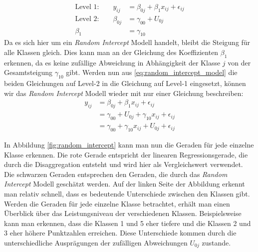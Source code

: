 \documentclass[12pt, a4paper]{article}\usepackage[]{graphicx}\usepackage[]{color}
\begin{document}
\begin{equation} \label{eq:random_intercept_model}
\begin{split}	
 \text{Level 1:}  	\qquad 	y_{ij} 		& = \beta_{0j} + \beta_{1}x_{ij} + \epsilon_{ij}\\
 \text{Level 2:} 	\qquad 	\beta_{0j} 	& = \gamma_{00} + U_{0j}\\
 							\beta_{1} 	& = \gamma_{10}
\end{split}	
\end{equation} 
Da es sich hier um ein \textit{Random Intercept} Modell handelt, bleibt die Steigung für alle Klassen gleich. Dies kann man an der Gleichung des Koeffizienten $\beta_{1}$ erkennen, da es keine zufällige Abweichung in Abhängigkeit der Klasse $j$ von der Gesamtsteigung $\gamma_{10}$ gibt. Werden nun aus \eqref{eq:random_intercept_model} die beiden Gleichungen auf Level-2 in die Gleichung auf Level-1 eingesetzt, können wir das \textit{Random Intercept} Modell wieder mit nur einer Gleichung beschreiben:
\begin{equation}
\begin{split}
y_{ij} 	& = \beta_{0j} + \beta_{1}x_{ij} + \epsilon_{ij} \\
		& = \gamma_{00} + U_{0j} + \gamma_{10}x_{ij} + \epsilon_{ij} \\
		& = \gamma_{00} + \gamma_{10}x_{ij} + U_{0j} + \epsilon_{ij}
\end{split}
\end{equation}

In Abbildung \ref{fig:random_intercept} kann man nun die Geraden für jede einzelne Klasse erkennen. Die rote Gerade entspricht der linearen Regressionsgerade, die durch die Disaggregation entsteht und wird hier als Vergleichswert verwendet. Die schwarzen Geraden entsprechen den Geraden, die durch das \textit{Random Intercept} Modell geschätzt werden. Auf der linken Seite der Abbildung erkennt man relativ schnell, dass es bedeutende Unterschiede zwischen den Klassen gibt. Werden die Geraden für jede einzelne Klasse betrachtet, erhält man einen Überblick über das Leistungsniveau der verschiedenen Klassen. Beispielsweise kann man erkennen, dass die Klassen 1 und 5 eher tiefere und die Klassen 2 und 3 eher höhere Punktzahlen erreichen. Diese Unterschiede kommen durch die unterschiedliche Ausprägungen der zufälligen Abweichungen $U_{0j}$ zustande. 
\end{document}
